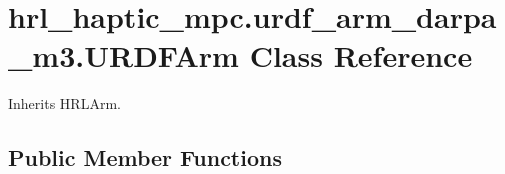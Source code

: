 \hypertarget{classhrl__haptic__mpc_1_1urdf__arm__darpa__m3_1_1_u_r_d_f_arm}{\section{hrl\-\_\-haptic\-\_\-mpc.\-urdf\-\_\-arm\-\_\-darpa\-\_\-m3.\-U\-R\-D\-F\-Arm \-Class \-Reference}
\label{classhrl__haptic__mpc_1_1urdf__arm__darpa__m3_1_1_u_r_d_f_arm}
}


\-Inherits \-H\-R\-L\-Arm.

\subsection*{\-Public \-Member \-Functions}
